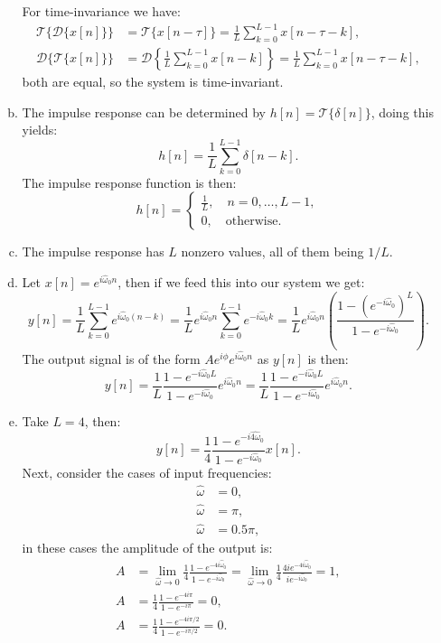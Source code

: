 \begin{enumerate}
\begin{enumerate}[a)]
For time-invariance we have:
\begin{align*}
    \mathcal{T}\{\mathcal{D}\{x[n]\}\}&=\mathcal{T}\{x[n-\tau]\}=\frac{1}{L}\sum_{k=0}^{L-1}x[n-\tau-k], \\
    \mathcal{D}\{\mathcal{T}\{x[n]\}\}&=\mathcal{D}\left\{\frac{1}{L}\sum_{k=0}^{L-1}x[n-k]\right\}=\frac{1}{L}\sum_{k=0}^{L-1}x[n-\tau-k],
\end{align*}
both are equal, so the system is time-invariant. 

\item The impulse response can be determined by $h[n]=\mathcal{T}\{\delta[n]\}$, doing this yields:
$$h[n]=\frac{1}{L}\sum_{k=0}^{L-1}\delta[n-k].$$
The impulse response function is then:
$$h[n]=\begin{cases}
    \frac{1}{L}, \quad n=0,\hdots,L-1, \\
    0, \quad \text{otherwise}.
\end{cases}$$

\item The impulse response has $L$ nonzero values, all of them being $1/L$. 

\item Let $x[n]=e^{i\hat{\omega}_{0}n}$, then if we feed this into our system we get:
$$y[n]=\frac{1}{L}\sum_{k=0}^{L-1}e^{i\hat{\omega}_{0}(n-k)}=\frac{1}{L}e^{i\hat{\omega}_{0}n}\sum_{k=0}^{L-1}e^{-i\hat{\omega}_{0}k}=\frac{1}{L}e^{i\hat{\omega}_{0}n}\left(\frac{1-(e^{-i\hat{\omega}_{0}})^{L}}{1-e^{-i\hat{\omega}_{0}}}\right).$$
The output signal is of the form $Ae^{i\phi}e^{i\hat{\omega}_{0}n}$ as $y[n]$ is then:
$$y[n]=\frac{1}{L}\frac{1-e^{-i\hat{\omega}_{0}L}}{1-e^{-i\hat{\omega}_{0}}}e^{i\hat{\omega}_{0}n}=\frac{1}{L}\frac{1-e^{-i\hat{\omega}_{0}L}}{1-e^{-i\hat{\omega}_{0}}}e^{i\hat{\omega}_{0}n}.$$

\item Take $L=4$, then:
$$y[n]=\frac{1}{4}\frac{1-e^{-i\hat{4\omega}_{0}}}{1-e^{-i\hat{\omega}_{0}}}x[n].$$
Next, consider the cases of input frequencies:
\begin{align*}
    \hat{\omega}&=0,\\
    \hat{\omega}&=\pi,\\
    \hat{\omega}&=0.5\pi,
\end{align*}
in these cases the amplitude of the output is:
\begin{align*}
    A&=\lim_{\hat{\omega}\to 0}\frac{1}{4}\frac{1-e^{-4i\hat{\omega}_{0}}}{1-e^{-i\hat{\omega}_{0}}}=\lim_{\hat{\omega}\to 0}\frac{1}{4}\frac{4ie^{-4i\hat{\omega}_{0}}}{ie^{-i\hat{\omega}_{0}}}=1, \\
    A&=\frac{1}{4}\frac{1-e^{-4i\pi}}{1-e^{-i\pi}}=0,\\
    A&=\frac{1}{4}\frac{1-e^{-4i\pi/2}}{1-e^{-i\pi/2}}=0.
\end{align*}


\end{enumerate}
\end{enumerate}
